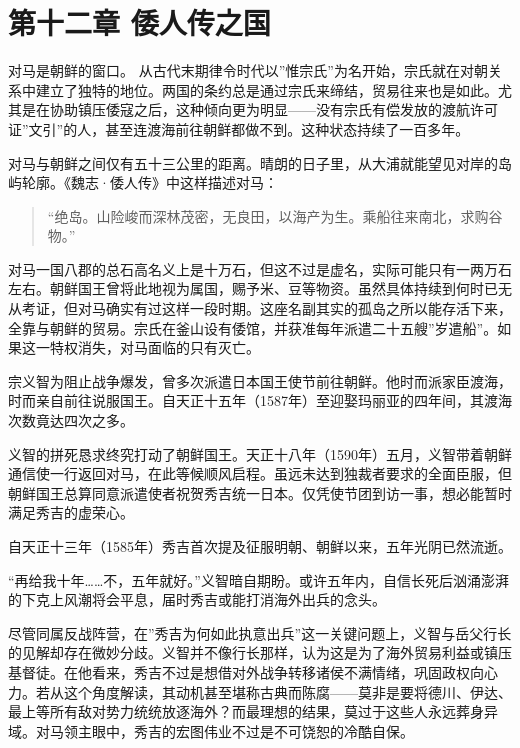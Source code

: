 \documentclass[
]{article}
\begin{document}
\section*{第十二章 倭人传之国}\label{ux7b2cux5341ux4e8cux7ae0-ux502dux4ebaux4f20ux4e4bux56fd}

对马是朝鲜的窗口。
从古代末期律令时代以''惟宗氏''为名开始，宗氏就在对朝关系中建立了独特的地位。两国的条约总是通过宗氏来缔结，贸易往来也是如此。尤其是在协助镇压倭寇之后，这种倾向更为明显------没有宗氏有偿发放的渡航许可证''文引''的人，甚至连渡海前往朝鲜都做不到。这种状态持续了一百多年。

对马与朝鲜之间仅有五十三公里的距离。晴朗的日子里，从大浦就能望见对岸的岛屿轮廓。《魏志·倭人传》中这样描述对马：

\begin{quote}
``绝岛。山险峻而深林茂密，无良田，以海产为生。乘船往来南北，求购谷物。''
\end{quote}

对马一国八郡的总石高名义上是十万石，但这不过是虚名，实际可能只有一两万石左右。朝鲜国王曾将此地视为属国，赐予米、豆等物资。虽然具体持续到何时已无从考证，但对马确实有过这样一段时期。这座名副其实的孤岛之所以能存活下来，全靠与朝鲜的贸易。宗氏在釜山设有倭馆，并获准每年派遣二十五艘''岁遣船''。如果这一特权消失，对马面临的只有灭亡。

宗义智为阻止战争爆发，曾多次派遣日本国王使节前往朝鲜。他时而派家臣渡海，时而亲自前往说服国王。自天正十五年（1587年）至迎娶玛丽亚的四年间，其渡海次数竟达四次之多。

义智的拼死恳求终究打动了朝鲜国王。天正十八年（1590年）五月，义智带着朝鲜通信使一行返回对马，在此等候顺风启程。虽远未达到独裁者要求的全面臣服，但朝鲜国王总算同意派遣使者祝贺秀吉统一日本。仅凭使节团到访一事，想必能暂时满足秀吉的虚荣心。

自天正十三年（1585年）秀吉首次提及征服明朝、朝鲜以来，五年光阴已然流逝。

``再给我十年\ldots\ldots 不，五年就好。''义智暗自期盼。或许五年内，自信长死后汹涌澎湃的下克上风潮将会平息，届时秀吉或能打消海外出兵的念头。

尽管同属反战阵营，在''秀吉为何如此执意出兵''这一关键问题上，义智与岳父行长的见解却存在微妙分歧。义智并不像行长那样，认为这是为了海外贸易利益或镇压基督徒。在他看来，秀吉不过是想借对外战争转移诸侯不满情绪，巩固政权向心力。若从这个角度解读，其动机甚至堪称古典而陈腐------莫非是要将德川、伊达、最上等所有敌对势力统统放逐海外？而最理想的结果，莫过于这些人永远葬身异域。对马领主眼中，秀吉的宏图伟业不过是不可饶恕的冷酷自保。
\end{document}
